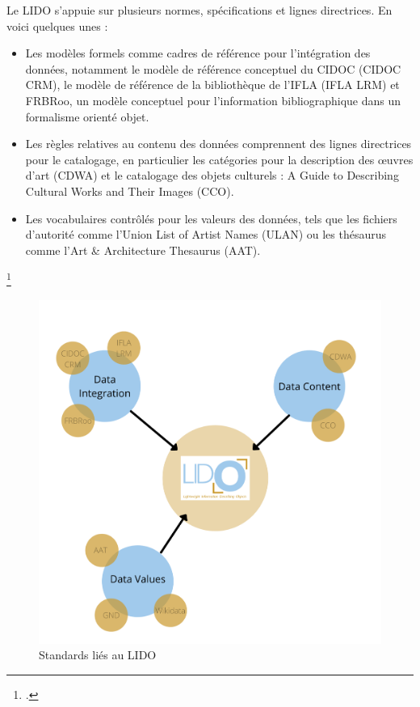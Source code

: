 Le LIDO s'appuie sur plusieurs normes, spécifications et lignes directrices. En voici quelques unes :
\begin{itemize}
    \item Les modèles formels comme cadres de référence pour l'intégration des données, notamment le modèle de référence conceptuel du CIDOC (CIDOC CRM), le modèle de référence de la bibliothèque de l'IFLA (IFLA LRM) et FRBRoo, un modèle conceptuel pour l'information bibliographique dans un formalisme orienté objet.
    \item Les règles relatives au contenu des données comprennent des lignes directrices pour le catalogage, en particulier les catégories pour la description des œuvres d'art (CDWA) et le catalogage des objets culturels : A Guide to Describing Cultural Works and Their Images (CCO).
    \item Les vocabulaires contrôlés pour les valeurs des données, tels que les fichiers d'autorité comme l'Union List of Artist Names (ULAN) ou les thésaurus comme l'Art \& Architecture Thesaurus (AAT).
\end{itemize}\footcite{lido_primer}
\begin{figure}[h!]
	\centerline{\includegraphics[width=\textwidth]{medias/figure_related-standards.png}}
	\caption{Standards liés au LIDO} 
\end{figure} \newline

